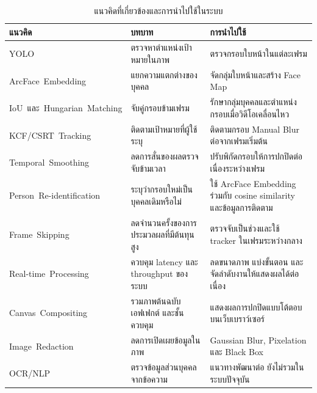 \begin{table}[H]
\centering
\caption{แนวคิดที่เกี่ยวข้องและการนำไปใช้ในระบบ}
\label{tab:related-approach}
\setlength{\tabcolsep}{4pt}
\begin{tabular}{|>{\raggedright\arraybackslash}p{}|>{\raggedright\arraybackslash}p{}|>{\raggedright\arraybackslash}p{}|}
\hline
\textbf{แนวคิด} & \textbf{บทบาท} & \textbf{การนำไปใช้} \\
\hline
\mbox{YOLO} & ตรวจหาตำแหน่งเป้าหมายในภาพ & ตรวจกรอบใบหน้าในแต่ละเฟรม \\
\hline
\mbox{ArcFace Embedding} & แยกความแตกต่างของบุคคล & จัดกลุ่มใบหน้าและสร้าง Face Map \\
\hline
\mbox{IoU และ Hungarian Matching} & จับคู่กรอบข้ามเฟรม & รักษากลุ่มบุคคลและตำแหน่งกรอบเมื่อวิดีโอเคลื่อนไหว \\
\hline
\mbox{KCF/CSRT Tracking} & ติดตามเป้าหมายที่ผู้ใช้ระบุ & ติดตามกรอบ Manual Blur ต่อจากเฟรมเริ่มต้น \\
\hline
\mbox{Temporal Smoothing} & ลดการสั่นของผลตรวจจับข้ามเวลา & ปรับพิกัดกรอบให้การปกปิดต่อเนื่องระหว่างเฟรม \\
\hline
\mbox{Person Re-identification} & ระบุว่ากรอบใหม่เป็นบุคคลเดิมหรือไม่ & ใช้ ArcFace Embedding ร่วมกับ cosine similarity และข้อมูลการติดตาม \\
\hline
\mbox{Frame Skipping} & ลดจำนวนครั้งของการประมวลผลที่มีต้นทุนสูง & ตรวจจับเป็นช่วงและใช้ tracker ในเฟรมระหว่างกลาง \\
\hline
\mbox{Real-time Processing} & ควบคุม latency และ throughput ของระบบ & ลดขนาดภาพ แบ่งขั้นตอน และจัดลำดับงานให้แสดงผลได้ต่อเนื่อง \\
\hline
\mbox{Canvas Compositing} & รวมภาพต้นฉบับ เอฟเฟกต์ และชั้นควบคุม & แสดงผลการปกปิดแบบโต้ตอบบนเว็บเบราว์เซอร์ \\
\hline
\mbox{Image Redaction} & ลดการเปิดเผยข้อมูลในภาพ & Gaussian Blur, Pixelation และ Black Box \\
\hline
\mbox{OCR/NLP} & ตรวจข้อมูลส่วนบุคคลจากข้อความ & แนวทางพัฒนาต่อ ยังไม่รวมในระบบปัจจุบัน \\
\hline
\end{tabular}
\end{table}
